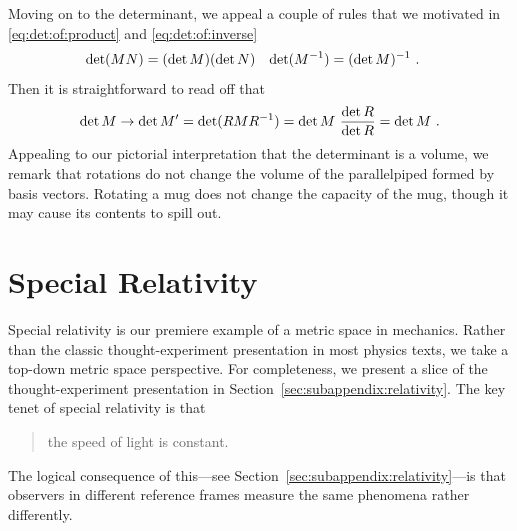 \documentclass[12pt, oneside]{report}    %
\begin{document}
\begin{subappendices}
Moving on to the determinant, we appeal a couple of rules that we motivated in \eqref{eq:det:of:product} and \eqref{eq:det:of:inverse}
\begin{align}
    \det(MN) &= (\det M)(\det N)
    &
    \det(M^{-1} ) &= (\det M)^{-1}  \ .
\end{align}
Then it is straightforward to read off that
\begin{align}
    \det M \to \det M' = \det(RMR^{-1} ) = \det M\ \frac{\det R}{\det R} = \det M \ .
\end{align}
Appealing to our pictorial interpretation that the determinant is a volume, we remark that rotations do not change the volume of the parallelpiped formed by basis vectors. Rotating a mug does not change the capacity of the mug, though it may cause its contents to spill out. 
\end{subappendices}




\chapter{Special Relativity}

Special relativity is our premiere example of a metric space in mechanics. Rather than the classic thought-experiment presentation in most physics texts, we take a top-down metric space perspective. For completeness, we present a slice of the thought-experiment presentation in Section~\ref{sec:subappendix:relativity}. The key tenet of special relativity is that 
\begin{quote}
the speed of light is constant.
\end{quote}
The logical consequence of this---see Section~\ref{sec:subappendix:relativity}---is that observers in different reference frames measure the same phenomena rather differently.
\end{document}

